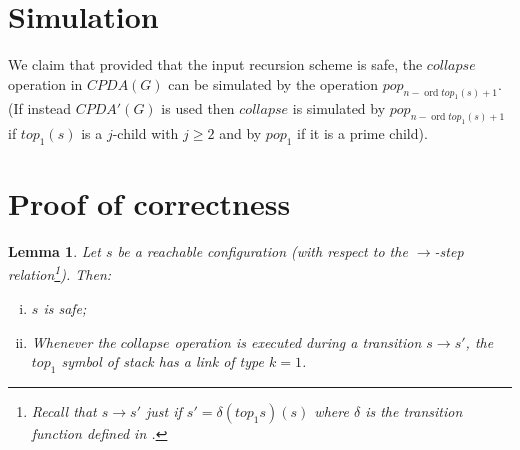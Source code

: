 \documentclass{article}
\newcommand{\ord}{\mathop{\mathrm{ord}}}
\newtheorem{lemma}{Lemma}[section]
\theoremstyle{remark}
\theoremstyle{definition}
\begin{document}
\section{Simulation}

We claim that provided that the input recursion scheme is safe, the
$collapse$ operation in $CPDA(G)$ can be simulated by the operation
$pop_{n-\ord{top_1(s)}+1}$. (If instead $CPDA'(G)$ is used then
$collapse$ is simulated by $pop_{n-\ord{top_1(s)}+1}$ if $top_1(s)$
is a $j$-child with $j\geq 2$ and by $pop_1$ if it is a prime
child).

\section{Proof of correctness}

\begin{lemma}
Let $s$ be a reachable configuration (with respect to the
$\rightarrow$-step relation\footnote{Recall that $s\rightarrow s'$
just if $s' = \delta(top_1 s)(s)$ where $\delta$ is the transition
function defined in \cite[Figure 2]{hague-sto07}.}). Then:
\begin{enumerate}[i.]
\item $s$ is safe;
\item Whenever the $collapse$ operation is executed during a
transition $s \rightarrow s'$, the $top_1$ symbol of stack has a
link of type $k=1$.
\end{enumerate}
\end{lemma}
\end{document}
